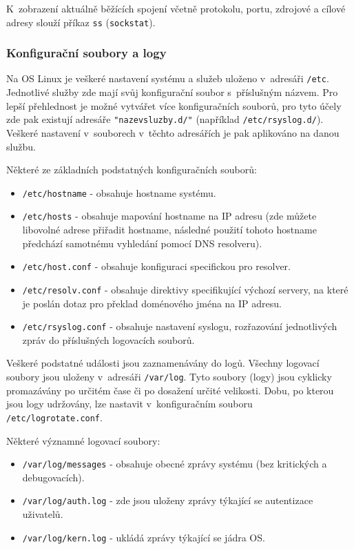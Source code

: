 K~zobrazení aktuálně běžících spojení včetně protokolu, portu, zdrojové a cílové adresy slouží příkaz \texttt{ss} (\texttt{sockstat}).

\subsubsection{Konfigurační soubory a logy}
Na OS Linux je veškeré nastavení systému a služeb uloženo v~adresáři \texttt{/etc}. Jednotlivé služby zde mají svůj konfigurační soubor s~příslušným názvem. Pro lepší přehlednost je možné vytvářet více konfiguračních souborů, pro tyto účely zde pak existují adresáře \texttt{"nazevsluzby.d/"} (například \texttt{/etc/rsyslog.d/}). Veškeré nastavení v~souborech v~těchto adresářích je pak aplikováno na danou službu.

Některé ze základních podstatných konfiguračních souborů:
\begin{itemize}
				\item \texttt{/etc/hostname} - obsahuje hostname systému.
				\item \texttt{/etc/hosts} - obsahuje mapování hostname na IP adresu (zde můžete libovolné adrese přiřadit hostname, následné použití tohoto hostname předchází samotnému vyhledání pomocí DNS resolveru).
				\item \texttt{/etc/host.conf} - obsahuje konfiguraci specifickou pro resolver.
				\item \texttt{/etc/resolv.conf} - obsahuje direktivy specifikující výchozí servery, na které je poslán dotaz pro překlad doménového jména na IP adresu.
				\item \texttt{/etc/rsyslog.conf} - obsahuje nastavení syslogu, rozřazování jednotlivých zpráv do příslušných logovacích souborů.
\end{itemize}


Veškeré podstatné události jsou zaznamenávány do logů. Všechny logovací soubory jsou uloženy v~adresáři \texttt{/var/log}. Tyto soubory (logy) jsou cyklicky promazávány po určitém čase či po dosažení určité velikosti. Dobu, po kterou jsou logy udržovány, lze nastavit v~konfiguračním souboru\\\texttt{/etc/logrotate.conf}.

Některé významné logovací soubory:
\begin{itemize}
				\item \texttt{/var/log/messages} - obsahuje obecné zprávy systému (bez kritických a debugovacích).
				\item \texttt{/var/log/auth.log} - zde jsou uloženy zprávy týkající se autentizace uživatelů.
				\item \texttt{/var/log/kern.log} - ukládá zprávy týkající se jádra OS.
\end{itemize}


